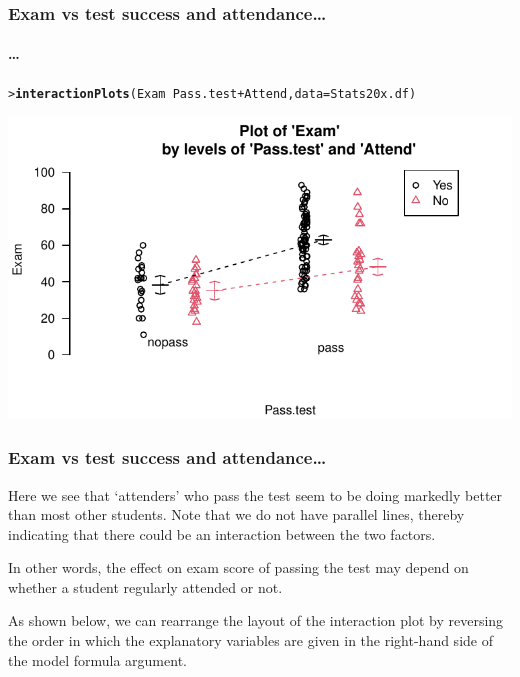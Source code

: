 \documentclass{beamer}\usepackage[]{graphicx}\usepackage[]{xcolor}
\makeatletter
\def\maxwidth{ %
  \ifdim\Gin@nat@width>\linewidth
    \linewidth
  \else
    \Gin@nat@width
  \fi
}
\newcommand{\hlopt}[1]{\textcolor[rgb]{0,0,0}{#1}}%
\newcommand{\hlstd}[1]{\textcolor[rgb]{0.345,0.345,0.345}{#1}}%
\newcommand{\hlkwc}[1]{\textcolor[rgb]{0.333,0.667,0.333}{#1}}%
\newcommand{\hlkwd}[1]{\textcolor[rgb]{0.737,0.353,0.396}{\textbf{#1}}}%
\newenvironment{kframe}{%
 \def\at@end@of@kframe{}%
 \ifinner\ifhmode%
  \def\at@end@of@kframe{\end{minipage}}%
  \begin{minipage}{\columnwidth}%
 \fi\fi%
 \def\FrameCommand##1{\hskip\@totalleftmargin \hskip-\fboxsep
 \colorbox{shadecolor}{##1}\hskip-\fboxsep
     \hskip-\linewidth \hskip-\@totalleftmargin \hskip\columnwidth}%
 \MakeFramed {\advance\hsize-\width
   \@totalleftmargin\z@ \linewidth\hsize
   \@setminipage}}%
 {\par\unskip\endMakeFramed%
 \at@end@of@kframe}
\newenvironment{knitrout}{}{} %
\makeatother
\begin{document}
\begin{frame}[fragile]
\frametitle{Exam vs test success and attendance\ldots}
\framesubtitle{\ldots}

\begin{knitrout}\scriptsize
{}\color{fgcolor}\begin{kframe}
\begin{alltt}
\hlstd{> }\hlkwd{interactionPlots}\hlstd{(Exam} \hlopt{~} \hlstd{Pass.test} \hlopt{+} \hlstd{Attend,} \hlkwc{data} \hlstd{= Stats20x.df)}
\end{alltt}
\end{kframe}
\end{knitrout}

\begin{knitrout}\scriptsize
{}\color{fgcolor}
\includegraphics[width=\maxwidth]{figure/RC-H12-005-1} 
\end{knitrout}

\end{frame}



\begin{frame}[fragile]
\frametitle{Exam vs test success and attendance\ldots}

Here we see that `attenders' who pass the test seem to be doing markedly better than most other students. Note that we do not have parallel lines, thereby indicating that there could be an interaction between the two factors.
\medskip

In other words, the effect on exam score of passing the test may depend on whether a student regularly attended or not.
\bigskip \bigskip

As shown below, we can rearrange the layout of the interaction plot by reversing the order in which the explanatory variables are given in the right-hand side of the model formula argument.
\end{frame}
\end{document}
